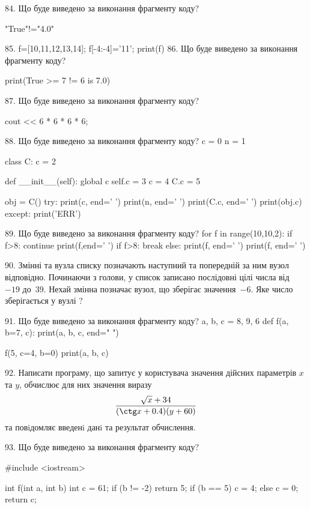\documentclass[11pt]{article}
\begin{document}
84. Що буде виведено за виконання фрагменту коду?

"True"!="4.0"

85. 
f=[10,11,12,13,14]; f[-4:-4]='11'; print(f)
86. Що буде виведено за виконання фрагменту коду?

print(True >= 7 != 6 is 7.0)

87. Що буде виведено за виконання фрагменту коду?

cout << 6 * 6 * 6 * 6;

88. Що буде виведено за виконання фрагменту коду?
c = 0
n = 1

class C:
    c = 2
    
    def __init__(self):
global c        self.c = 3
        c = 4
        C.c = 5

obj = C()
try:
    print(c, end=' ')
    print(n, end=' ')
    print(C.c, end=' ')
    print(obj.c)
except:
    print('ERR')

89. Що буде виведено за виконання фрагменту коду?
for f in range(10,10,2):
    if f>8:
        continue
        print(f,end=' ')
    if f>8:
        break
else:
    print(f, end=' ')
print(f, end=' ')

90. 
Змінні  та  вузла списку позначають наступний та попередній за ним вузол відповідно. Починаючи з голови, у список записано послідовні цілі числа від~$-19$ до~$39$. Нехай змінна  позначає вузол, що зберігає значення~$-6$.
Яке число зберігається у вузлі  ?

91. Що буде виведено за виконання фрагменту коду?
a, b, c = 8, 9, 6
def f(a, b=7, c):
    print(a, b, c, end=" ")

f(5, c=4, b=0)
print(a, b, c)

92. 
Написати програму, що запитує у користувача значення дійсних параметрів $x$ та $y$, обчислює для них значення виразу 
$$\frac{\sqrt x + 34}{(\ctg x + 0.4) (y + 60)}$$ 
та повiдомляє введенi данi та результат обчислення.


93. Що буде виведено за виконання фрагменту коду?

#include <iostream>

int f(int a, int b){
    int c = 61;
    if (b != -2)
        return 5;
    if (b == 5)
         c = 4;
    else 
        c = 0;
    return c;
}
\end{document}
